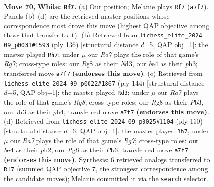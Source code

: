 \documentclass[11pt]{article}
\begin{document}
\clearpage

\begin{figure}[p]\centering
\begin{subfigure}{0.46\textwidth}\centering
\resizebox{\linewidth}{!}{%
\newchessgame
\chessboard[
  setfen={6R1/R7/3k4/8/1P2b3/7r/8/4K3 w - - 13 70},
  showmover=false,
  pgfstyle=straightmove, color=movearrow, markmove={a7-f7}
]}
\caption{}
\end{subfigure}\hfill
\begin{subfigure}{0.46\textwidth}\centering
\resizebox{\linewidth}{!}{%
\newchessgame
\chessboard[
  setfen={8/6R1/4r3/8/8/2PN1k1p/K7/8 w - - 8 69},
  showmover=false,
  pgfstyle=straightmove, color=movearrow, markmove={g7-h7}
]}
\caption{}
\end{subfigure}
\\[4pt]
\begin{subfigure}{0.46\textwidth}\centering
\resizebox{\linewidth}{!}{%
\newchessgame
\chessboard[
  setfen={6R1/8/3b4/8/4K2p/1P6/5k2/8 w - - 40 73},
  showmover=false,
  pgfstyle=straightmove, color=movearrow, markmove={g8-d8}
]}
\caption{}
\end{subfigure}\hfill
\begin{subfigure}{0.46\textwidth}\centering
\resizebox{\linewidth}{!}{%
\newchessgame
\chessboard[
  setfen={2r5/6R1/1P6/8/1K6/8/5k1p/8 w - - 6 66},
  showmover=false,
  pgfstyle=straightmove, color=movearrow, markmove={g7-h7}
]}
\caption{}
\end{subfigure}
\caption{\textbf{Move 70, White: \texttt{Rf7}.} (a) Our position; Melanie plays \texttt{Rf7} (\texttt{a7f7}). Panels (b)--(d) are the retrieved master positions whose correspondence most drove this move (highest QAP objective among those that transfer to it). (b) Retrieved from \texttt{lichess\_elite\_2024-09\_p0031\#1593} (ply 136) [structural distance $d$=5, QAP obj=1]: the master played \texttt{Rh7}; under $\mu$ our \emph{Ra7} plays the role of that game's \emph{Rg7}; cross-type roles: our \emph{R}g8 as their \emph{N}d3, our \emph{b}e4 as their \emph{p}h3; transferred move \texttt{a7f7} \textbf{(endorses this move)}. (c) Retrieved from \texttt{lichess\_elite\_2024-09\_p0022\#1867} (ply 144) [structural distance $d$=5, QAP obj=1]: the master played \texttt{Rd8}; under $\mu$ our \emph{Ra7} plays the role of that game's \emph{Rg8}; cross-type roles: our \emph{R}g8 as their \emph{P}b3, our \emph{r}h3 as their \emph{p}h4; transferred move \texttt{a7f7} \textbf{(endorses this move)}. (d) Retrieved from \texttt{lichess\_elite\_2024-09\_p0025\#1104} (ply 130) [structural distance $d$=6, QAP obj=1]: the master played \texttt{Rh7}; under $\mu$ our \emph{Ra7} plays the role of that game's \emph{Rg7}; cross-type roles: our \emph{b}e4 as their \emph{p}h2, our \emph{R}g8 as their \emph{P}b6; transferred move \texttt{a7f7} \textbf{(endorses this move)}. Synthesis: 6 retrieved analogs transferred to \texttt{Rf7} (summed QAP objective 7, the strongest correspondence among the candidate moves); Melanie committed it via the \texttt{search} selector.}
\label{fig:thought-m138}
\end{figure}
\end{document}
